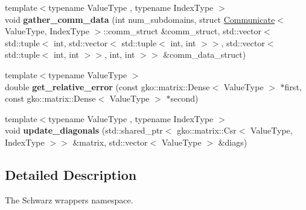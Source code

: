 \begin{DoxyCompactItemize}
{\footnotesize template$<$typename Value\+Type , typename Index\+Type $>$ }\\void {\bfseries gather\+\_\+comm\+\_\+data} (int num\+\_\+subdomains, struct \hyperlink{classschwz_1_1Communicate}{Communicate}$<$ Value\+Type, Index\+Type $>$\+::comm\+\_\+struct \&comm\+\_\+struct, std\+::vector$<$ std\+::tuple$<$ int, std\+::vector$<$ std\+::tuple$<$ int, int $>$$>$, std\+::vector$<$ std\+::tuple$<$ int, int $>$$>$, int, int $>$$>$ \&comm\+\_\+data\+\_\+struct)
\item 
\mbox{\label{namespaceschwz_a326d36155d6eeccd87f66fdf5200df29}} 
{\footnotesize template$<$typename Value\+Type $>$ }\\double {\bfseries get\+\_\+relative\+\_\+error} (const gko\+::matrix\+::\+Dense$<$ Value\+Type $>$ $\ast$first, const gko\+::matrix\+::\+Dense$<$ Value\+Type $>$ $\ast$second)
\item 
\mbox{\label{namespaceschwz_aac5839ef31d9d40a6a9c80a8611b6e50}} 
{\footnotesize template$<$typename Value\+Type , typename Index\+Type $>$ }\\void {\bfseries update\+\_\+diagonals} (std\+::shared\+\_\+ptr$<$ gko\+::matrix\+::\+Csr$<$ Value\+Type, Index\+Type $>$$>$ \&matrix, std\+::vector$<$ Value\+Type $>$ \&diags)
\end{DoxyCompactItemize}


\subsection{Detailed Description}
The Schwarz wrappers namespace. 